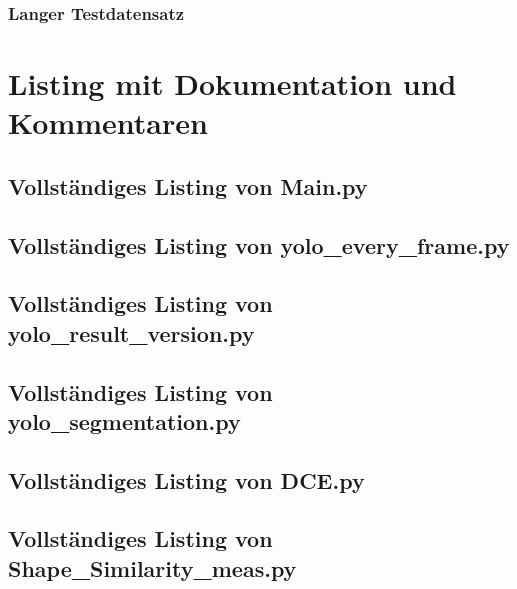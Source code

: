 {{    }
    \subsubsection{Langer Testdatensatz}{
          

    }

}
\section{Listing mit Dokumentation und Kommentaren}{\label{cd:gesamt_listing}}




\subsection{Vollständiges Listing von Main.py}{
    }

\subsection{Vollständiges Listing von yolo\_every\_frame.py}{
    }

\subsection{Vollständiges Listing von yolo\_result\_version.py}{
    }

\subsection{Vollständiges Listing von yolo\_segmentation.py}{
    }

\subsection{Vollständiges Listing von DCE.py}{
    }

\subsection{ Vollständiges Listing von Shape\_Similarity\_meas.py}{
    
}

